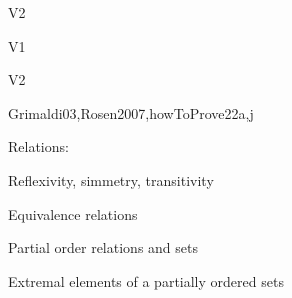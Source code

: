\begin{syllabus}
\begin{outcomes}{V2}
    \item {}
    \item {}
\end{outcomes}

\begin{competences}{V1}
    \item {}
    \item {}
\end{competences}

\begin{competences}{V2}
    \item {}
    \item {}
\end{competences}

\begin{unit}{\DSSetsRelationsandFunctions}{}{Grimaldi03,Rosen2007,howToProve}{22}{a,j}
\begin{topics}
    \item \DSSetsRelationsandFunctionsTopicSets
    \item Relations:
        \begin{subtopics}
            \item Reflexivity, simmetry, transitivity
            \item Equivalence relations
            \item Partial order relations and sets
            \item Extremal elements of a partially ordered sets
        \end{subtopics}
    \item \DSSetsRelationsandFunctionsTopicFunctions
\end{topics}
\begin{learningoutcomes}
    \item \DSSetsRelationsandFunctionsLOExplainWith [\Assessment]
    \item \DSSetsRelationsandFunctionsLOPerformThe [\Assessment]
    \item \DSSetsRelationsandFunctionsLORelate [\Assessment]
\end{learningoutcomes}
\end{unit}


\end{syllabus}
